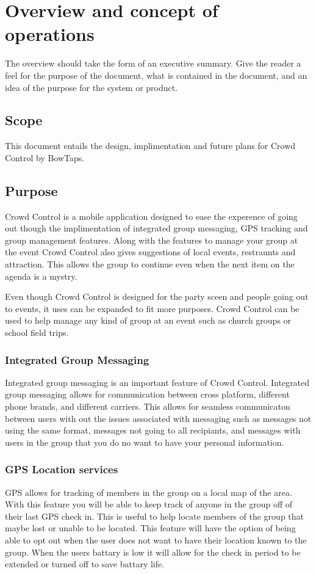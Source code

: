 
\chapter{Overview and concept of operations}

The overview should take the form of an executive summary.  Give the reader a feel 
for the purpose of the document, what is contained in the document, and an idea 
of the purpose for the system or product. 


\section{Scope}
This document entails the design, implimentation and future plans for Crowd Control by BowTaps. 


\section{Purpose}
Crowd Control is a mobile application designed to ease the experence of going out though the implimentation of integrated group messaging, GPS tracking and group management features. Along with the features to manage your group at the event Crowd Control also gives suggestions of local events, restraunts and attraction. This allows the group to continue even when the next item on the agenda is a mystry. 


Even though Crowd Control is designed for the party sceen and people going out to events, it uses can be expanded to fit more purposes. Crowd Control can be used to help manage any kind of group at an event such as church groups or school field trips.


\subsection{Integrated Group Messaging}
Integrated group messaging is an important feature of Crowd Control. Integrated group messaging allows for communication between cross platform, different phone brands, and different carriers. This allows for seamless communicaton between users with out the issues associated with messaging such as messages not using the same format, messages not going to all recipiants, and messages with users in the group that you do no want to have your personal information.

\subsection{GPS Location services}
GPS allows for tracking of members in the group on a local map of the area. With this feature you will be able to keep track of anyone in the group off of their last GPS check in. This is useful to help locate members of the group that maybe lost or unable to be located. This feature will have the option of being able to opt out when the user does not want to have their location known to the group. When the users battary is low it will allow for the check in period to be extended or turned off to save battary life.

